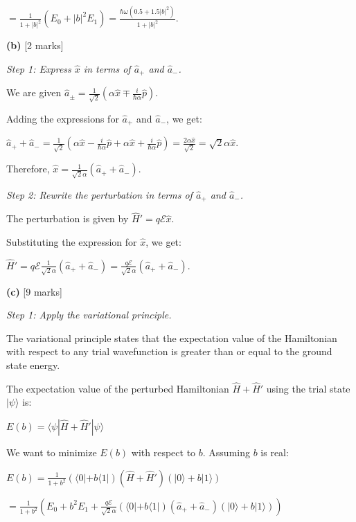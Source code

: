 \documentclass{article}
\begin{document}
\noindent $= \frac{1}{1+|b|^2} (E_0 + |b|^2 E_1) = \frac{\hbar\omega(0.5 + 1.5|b|^2)}{1+|b|^2}$.

\textbf{(b)} [2 marks]

\noindent\textit{Step 1: Express $\hat{x}$ in terms of $\hat{a}_+$ and $\hat{a}_-$.}

\noindent We are given $\hat{a}_\pm = \frac{1}{\sqrt{2}} \left(\alpha \hat{x} \mp \frac{i}{\hbar \alpha} \hat{p}\right)$.

\noindent Adding the expressions for $\hat{a}_+$ and $\hat{a}_-$, we get:

\noindent $\hat{a}_+ + \hat{a}_- = \frac{1}{\sqrt{2}} (\alpha \hat{x} - \frac{i}{\hbar \alpha} \hat{p} + \alpha \hat{x} + \frac{i}{\hbar \alpha} \hat{p}) = \frac{2\alpha \hat{x}}{\sqrt{2}} = \sqrt{2}\alpha \hat{x}$.

\noindent Therefore, $\hat{x} = \frac{1}{\sqrt{2}\alpha}(\hat{a}_+ + \hat{a}_-)$.

\noindent\textit{Step 2: Rewrite the perturbation in terms of $\hat{a}_+$ and $\hat{a}_-$.}

\noindent The perturbation is given by $\hat{H}' = q\mathcal{E}\hat{x}$.

\noindent Substituting the expression for $\hat{x}$, we get:

\noindent $\hat{H}' = q\mathcal{E} \frac{1}{\sqrt{2}\alpha}(\hat{a}_+ + \hat{a}_-) = \frac{q\mathcal{E}}{\sqrt{2}\alpha}(\hat{a}_+ + \hat{a}_-)$.

\textbf{(c)} [9 marks]

\noindent\textit{Step 1: Apply the variational principle.}

\noindent The variational principle states that the expectation value of the Hamiltonian with respect to any trial wavefunction is greater than or equal to the ground state energy.

\noindent The expectation value of the perturbed Hamiltonian $\hat{H} + \hat{H}'$ using the trial state $|\psi\rangle$ is:

\noindent $E(b) = \langle \psi | \hat{H} + \hat{H}' | \psi \rangle$

\noindent We want to minimize $E(b)$ with respect to $b$.
\noindent Assuming \(b\) is real:

\noindent $E(b) = \frac{1}{1+b^2} (\langle 0| + b\langle 1|) (\hat{H} + \hat{H}') (|0\rangle + b|1\rangle)$

\noindent $= \frac{1}{1+b^2} (E_0 + b^2 E_1 + \frac{q\mathcal{E}}{\sqrt{2}\alpha} (\langle 0| + b\langle 1|) (\hat{a}_+ + \hat{a}_-) (|0\rangle + b|1\rangle))$
\end{document}
